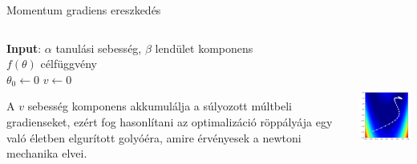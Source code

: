 \documentclass[english, aspectratio=169]{beamer}
\begin{document}
\begin{frame}{Momentum gradiens ereszkedés}
	\begin{columns}
		\begin{column}{.7\textwidth}
			\begin{algorithm}[H]
				\SetAlgoLined
				\caption{Momentum gradiens ereszkedés}
				\textbf{Input}: $\alpha$ tanulási sebesség, $\beta$ lendület komponens\\
				$f(\theta)$ célfüggvény\\
				$\theta_0 \leftarrow 0$
				$v \leftarrow 0$
			\end{algorithm}
			A $v$ sebesség komponens akkumulálja a súlyozott múltbeli gradienseket, ezért fog hasonlítani az optimalizáció röppályája egy való életben elgurított golyóéra, amire érvényesek a newtoni mechanika elvei. 
		\end{column}
		\begin{column}{.3\textwidth}
			\begin{center}
				\includegraphics[width=5cm, height=5cm, keepaspectratio]{images/gd_momentum.png}
			\end{center}
		\end{column}
	\end{columns}
\end{frame}
\end{document}
